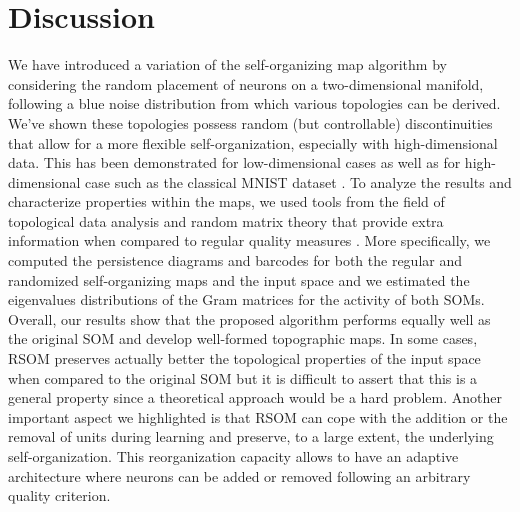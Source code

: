 
\section{Discussion}

We have introduced a variation of the self-organizing map algorithm by considering the random placement of neurons on a two-dimensional manifold, following a blue noise distribution from which various topologies can be derived. We've shown these topologies possess random (but controllable) discontinuities that allow for a more flexible self-organization, especially with high-dimensional data. This has been demonstrated for low-dimensional cases as well as for high-dimensional case such as the classical MNIST dataset \citep{Lecun:1998}. To analyze the results and characterize properties within the maps, we used tools from the field of topological data analysis and random matrix theory that provide extra information when compared to regular quality measures \citep{Polani2002}. More specifically, we computed the persistence diagrams and barcodes for both the regular and randomized self-organizing maps and the input space and we estimated the eigenvalues distributions of the Gram matrices for the activity of both SOMs. Overall, our results show that the proposed algorithm performs equally well as the original SOM and develop well-formed topographic maps. In some cases, RSOM preserves actually better the topological properties of the input space when compared to the original SOM but it is difficult to assert that this is a general property since a theoretical approach would be a hard problem. Another important aspect we highlighted is that RSOM can cope with the addition or the removal of units during learning and preserve, to a large extent, the underlying self-organization. This reorganization capacity allows to have an adaptive architecture where neurons can be added or removed following an arbitrary quality criterion.

